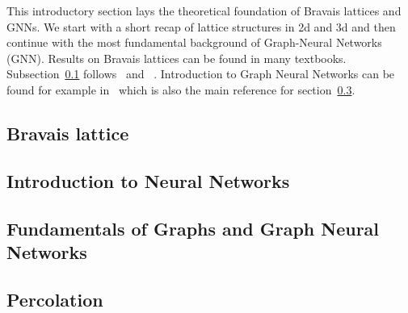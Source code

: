 This introductory section lays the theoretical foundation of Bravais lattices and GNNs. 
We start with a short recap of lattice structures in 2d and 3d and then continue with 
the most fundamental background of Graph-Neural Networks (GNN). 
Results on Bravais lattices can be found in many textbooks. Subsection~\ref{sec:brav_latt} follows~\cite{Schwarzenberger} and ~\cite{symGroupsApplications}.
Introduction to Graph Neural Networks can be found for example in~\cite{IntroMessagePassing} which is also the main reference for section~\ref{sec:fund_gnns}.

\subsection{Bravais lattice}
\label{sec:brav_latt}


\subsection{Introduction to Neural Networks}
\label{sec:intro_nn}


\subsection{Fundamentals of Graphs and Graph Neural Networks}
\label{sec:fund_gnns}


\subsection{Percolation}
\label{sec:intro_percolation}
